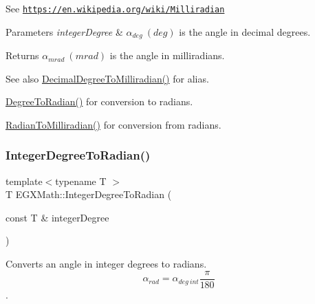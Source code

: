 See \href{https://en.wikipedia.org/wiki/Milliradian}{\tt https\+://en.\+wikipedia.\+org/wiki/\+Milliradian} 
\begin{DoxyParams}{Parameters}
{\em integer\+Degree} & $\alpha_{deg}\ (deg)$ is the angle in decimal degrees. \\
\hline
\end{DoxyParams}
\begin{DoxyReturn}{Returns}
$\alpha_{mrad}\ (mrad)$ is the angle in milliradians. 
\end{DoxyReturn}
\begin{DoxySeeAlso}{See also}
\mbox{\hyperlink{group___e_g_x_math-_angle_conversions-_decimal_degree_gab567d02d4692d9642a4ad219e479713a}{Decimal\+Degree\+To\+Milliradian()}} for alias. 

\mbox{\hyperlink{group___e_g_x_math-_angle_conversions-_degree_ga48585541b228c852c9d08a9eac3682f0}{Degree\+To\+Radian()}} for conversion to radians. 

\mbox{\hyperlink{group___e_g_x_math-_angle_conversions-_radian_gaea391f0cca39b05e298dd1cae162e7f1}{Radian\+To\+Milliradian()}} for conversion from radians. 
\end{DoxySeeAlso}
\mbox{\label{group___e_g_x_math-_angle_conversions-_integer_degree_ga05d3368b00ea27b9895de2ffe5c8df38}} 
\subsubsection{\texorpdfstring{Integer\+Degree\+To\+Radian()}{IntegerDegreeToRadian()}}
{\footnotesize\ttfamily template$<$typename T $>$ \\
T E\+G\+X\+Math\+::\+Integer\+Degree\+To\+Radian (\begin{DoxyParamCaption}\item[{const T \&}]{integer\+Degree }\end{DoxyParamCaption})}



Converts an angle in integer degrees to radians. \[\alpha_{rad}=\alpha_{deg\ int}\frac{\pi}{180}\]. 

